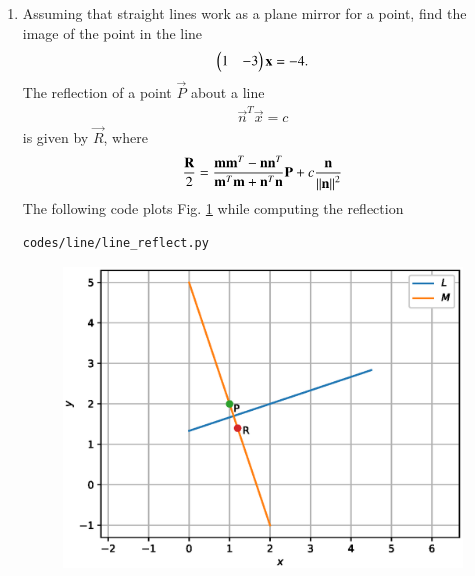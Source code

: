 \begin{enumerate}[label=\arabic*.,ref=\thesubsection.\theenumi]
\item Assuming that straight lines work as a plane mirror for a point, find the image of the point  in the line 
%
\begin{align}
\begin{pmatrix}1 & -3\end{pmatrix}\mathbf{x}  = -4.
\end{align}
%
\solution The reflection of a point $\vec{P}$ about a line 
%
\begin{align}
\vec{n}^T\vec{x}  = c
\end{align}
%
is given by $\vec{R}$, where
\begin{align}
\label{eq:line_reflect}
\frac{\mathbf{R}}{2} = \frac{\mathbf{m}\mathbf{m}^T-\mathbf{n}\mathbf{n}^T}{\mathbf{m}^T\mathbf{m}+\mathbf{n}^T\mathbf{n}}\mathbf{P} + c \frac{\mathbf{n}}{\left\lVert\mathbf{n}\right\rVert^2}
\end{align}
%
The following code plots Fig. \ref{fig:line_reflect} while computing the reflection
%
\begin{lstlisting}
codes/line/line_reflect.py
\end{lstlisting}
%
\begin{figure}[!ht]
\includegraphics[width=\columnwidth]{./line/figs/line_reflect.eps}
\caption{}
\label{fig:line_reflect}
\end{figure}
%


\end{enumerate}
